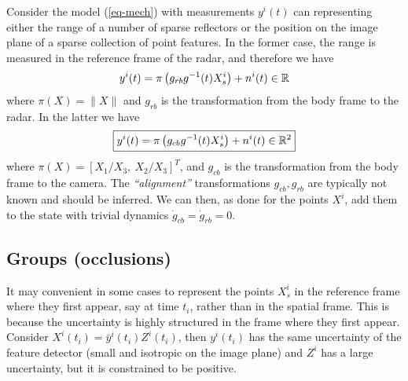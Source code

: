 Consider the model (\ref{eq-mech}) with measurements $y^i(t)$ can representing either the range of a number of sparse reflectors or the position on the image plane of a sparse collection of point features. In the former case, the range is measured in the reference frame of the radar, and therefore we have 
\begin{equation}
y^i(t) = \pi\left( g_{rb} g^{-1}(t) X_s^i \right) + n^i(t) \in \mathbb{R}
\end{equation}
where $\pi(X) = \| X \|$ and $g_{rb}$ is the transformation from the body frame to the radar. In the latter we have 
\begin{equation}
\boxed{y^i(t) = \pi\left( g_{cb} g^{-1}(t) X_s^i \right) + n^i(t) \in \mathbb{R}^2}
\end{equation}
where $\pi(X) = [X_1/X_3, \ X_2/X_3]^T$, and $g_{cb}$ is the transformation from the body frame to the camera. The {\em ``alignment''} transformations $g_{cb}, g_{rb}$ are typically not known and should be inferred. We can then, as done for the points $X^i$, add them to the state with trivial dynamics $\dot g_{cb} = \dot g_{rb} = 0$.

\subsection{Groups (occlusions)}

It may convenient in some cases to represent the points $X_s^i$ in the reference frame where they first appear, say at time $t_i$, rather than in the spatial frame. This is because the uncertainty is highly structured in the frame where they first appear. 
Consider $X^i(t_i) = \bar y^i(t_i) Z^i(t_i)$, then $y^i(t_i)$ has the same uncertainty of the feature detector (small and isotropic on the image plane) and $Z^i$ has a large uncertainty, but it is constrained to be positive. 

